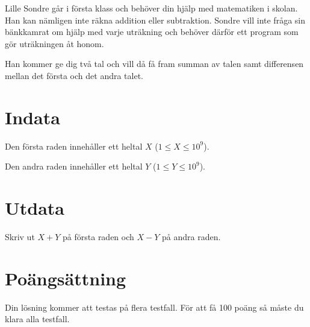 Lille Sondre går i första klass och behöver din hjälp med matematiken i skolan. Han
kan nämligen inte räkna addition eller subtraktion. Sondre vill inte fråga sin
bänkkamrat om hjälp med varje uträkning och behöver därför ett program som gör uträkningen åt honom.

Han kommer ge dig två tal och vill då få fram summan av talen samt differensen mellan det första och det andra talet.

\section*{Indata}
Den första raden innehåller ett heltal $X$ ($1 \leq X \leq 10^9$).

Den andra raden innehåller ett heltal $Y$ ($1 \leq Y \leq 10^9$).

\section*{Utdata}
Skriv ut $X + Y$ på första raden och $X - Y$ på andra raden.

\section*{Poängsättning}
Din lösning kommer att testas på flera testfall. För att få 100 poäng så måste du klara alla testfall.

